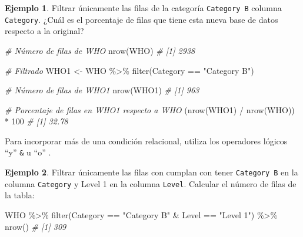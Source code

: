 \documentclass[
]{article}
\newenvironment{Shaded}{\begin{snugshade}}{\end{snugshade}}
\newcommand{\CommentTok}[1]{\textcolor[rgb]{0.56,0.35,0.01}{\textit{#1}}}
\newcommand{\DecValTok}[1]{\textcolor[rgb]{0.00,0.00,0.81}{#1}}
\newcommand{\FunctionTok}[1]{\textcolor[rgb]{0.00,0.00,0.00}{#1}}
\newcommand{\NormalTok}[1]{#1}
\newcommand{\OtherTok}[1]{\textcolor[rgb]{0.56,0.35,0.01}{#1}}
\newcommand{\SpecialCharTok}[1]{\textcolor[rgb]{0.00,0.00,0.00}{#1}}
\newcommand{\StringTok}[1]{\textcolor[rgb]{0.31,0.60,0.02}{#1}}
\theoremstyle{definition}
\theoremstyle{definition}
\newtheorem{example}{Ejemplo}[section]
\theoremstyle{definition}
\theoremstyle{definition}
\theoremstyle{remark}
\begin{document}
\begin{example}

Filtrar únicamente las filas de la categoría \texttt{Category\ B} columna \texttt{Category}.
¿Cuál es el porcentaje de filas que tiene esta nueva base de datos respecto a la original?

\begin{Shaded}
\begin{Highlighting}[]
\CommentTok{\# Número de filas de WHO}
\FunctionTok{nrow}\NormalTok{(WHO)}
\CommentTok{\# [1] 2938}

\CommentTok{\# Filtrado}
\NormalTok{WHO1 }\OtherTok{\textless{}{-}}\NormalTok{ WHO }\SpecialCharTok{\%\textgreater{}\%} \FunctionTok{filter}\NormalTok{(Category }\SpecialCharTok{==} \StringTok{"Category B"}\NormalTok{)}

\CommentTok{\# Número de filas de WHO1}
\FunctionTok{nrow}\NormalTok{(WHO1)}
\CommentTok{\# [1] 963}

\CommentTok{\# Porcentaje de filas en WHO1 respecto a WHO}
\NormalTok{(}\FunctionTok{nrow}\NormalTok{(WHO1) }\SpecialCharTok{/} \FunctionTok{nrow}\NormalTok{(WHO)) }\SpecialCharTok{*} \DecValTok{100}
\CommentTok{\# [1] 32.78}
\end{Highlighting}
\end{Shaded}

\end{example}

Para incorporar más de una condición relacional, utiliza los operadores lógicos ``y'' \texttt{\&} u ``o'' \texttt{\textbar{}}.

\begin{example}

Filtrar únicamente las filas con cumplan con tener \texttt{Category\ B} en la columna \texttt{Category} y Level 1 en la columna \texttt{Level}. Calcular el número de filas de la tabla:

\begin{Shaded}
\begin{Highlighting}[]
\NormalTok{WHO }\SpecialCharTok{\%\textgreater{}\%} 
  \FunctionTok{filter}\NormalTok{(Category }\SpecialCharTok{==} \StringTok{"Category B"} \SpecialCharTok{\&}\NormalTok{ Level }\SpecialCharTok{==} \StringTok{"Level 1"}\NormalTok{) }\SpecialCharTok{\%\textgreater{}\%} 
  \FunctionTok{nrow}\NormalTok{()}
\CommentTok{\# [1] 309}
\end{Highlighting}
\end{Shaded}

\end{example}
\end{document}
